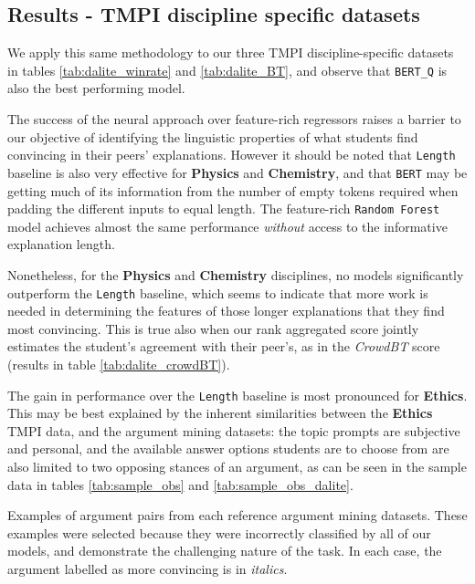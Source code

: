 \documentclass[notitlepage,12pt]{jedm}
\begin{document}
\subsection{Results - TMPI discipline specific datasets}
We apply this same methodology to our three TMPI discipline-specific datasets 
in tables \ref{tab:dalite_winrate} and \ref{tab:dalite_BT}, and observe that 
\verb|BERT_Q| is also the best performing model.

The success of the neural approach over feature-rich regressors raises a 
barrier to our objective of identifying the linguistic properties of what 
students find convincing in their peers' explanations.
However it should be noted that \verb|Length| baseline is also very effective 
for \textbf{Physics} and \textbf{Chemistry}, and that \verb|BERT| may be 
getting much of its information from the number of empty tokens required when 
padding the different inputs to equal length.
The feature-rich \verb|Random Forest| model achieves almost the same 
performance \textit{without} access to the informative explanation length.

Nonetheless, for the \textbf{Physics} and \textbf{Chemistry} disciplines, no 
models significantly outperform the \verb|Length| baseline, which seems to 
indicate that more work is needed in determining the features of those longer 
explanations that they find most convincing.
This is true also when our rank aggregated score jointly estimates the 
student's agreement with their peer's, as in the \textit{CrowdBT} score 
(results in table \ref{tab:dalite_crowdBT}).

The gain in performance over the \verb|Length| baseline is most pronounced for 
\textbf{Ethics}.
This may be best explained by the inherent similarities between the 
\textbf{Ethics} TMPI data, and the argument mining datasets: the topic prompts 
are subjective and personal, and the available answer options students are to 
choose from are also limited to two opposing stances of an argument, as can be 
seen in the sample data in tables \ref{tab:sample_obs} and 
\ref{tab:sample_obs_dalite}. 

\begin{table}
	\caption{
		Examples of argument pairs from each reference argument mining 
		datasets. 
		These examples were selected because they were incorrectly classified 
		by all of our models, and demonstrate the challenging nature of the 
		task. 
		In each case, the argument labelled as more convincing is in 
		\textit{italics}.
	}
	\label{tab:sample_obs}
	\begin{subtable}[t]{\textwidth}
		
	\end{subtable}
	\begin{subtable}[t]{\textwidth}
		
	\end{subtable}
\end{table}
\end{document}
